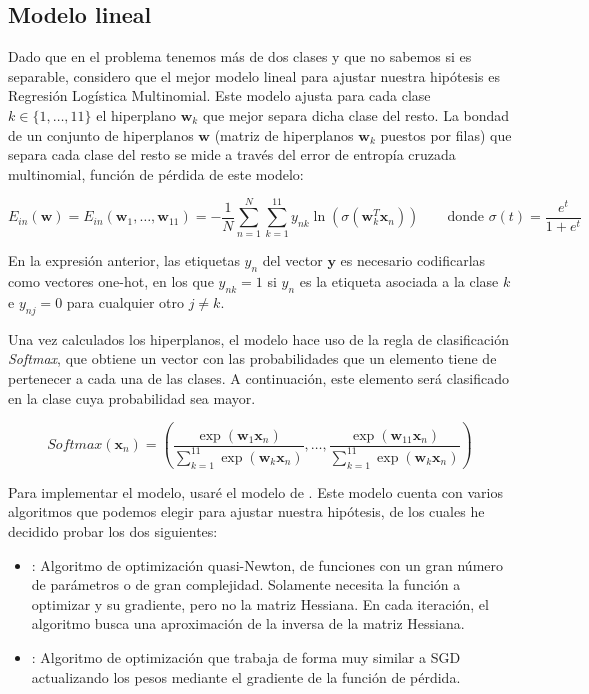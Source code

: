 \documentclass[10pt,a4paper]{article}
\begin{document}
\subsection{Modelo lineal}

Dado que en el problema tenemos más de dos clases y que no sabemos si es separable, considero que el mejor modelo lineal para ajustar nuestra hipótesis es Regresión Logística Multinomial. Este modelo ajusta para cada clase $k \in \{1,\dots,11\}$ el hiperplano $\textbf{w}_k$ que mejor separa dicha clase del resto. La bondad de un conjunto de hiperplanos $\textbf{w}$ (matriz de hiperplanos $\textbf{w}_k$ puestos por filas) que separa cada clase del resto se mide a través del error de entropía cruzada multinomial, función de pérdida de este modelo:

$$E_{in}(\textbf{w}) = E_{in}(\textbf{w}_1,\dots,\textbf{w}_{11}) = - \frac{1}{N} \sum_{n=1}^{N} \sum_{k=1}^{11} y_{nk} \ln(\sigma(\textbf{w}_k^T \textbf{x}_n)) \qquad \text{donde } \sigma(t)=\frac{e^t}{1+e^t}$$

En la expresión anterior, las etiquetas $y_n$ del vector $\textbf{y}$ es necesario codificarlas como vectores one-hot, en los que $y_{nk} = 1$ si $y_n$ es la etiqueta asociada a la clase $k$ e $y_{nj} = 0$ para cualquier otro $j \neq k$.

Una vez calculados los hiperplanos, el modelo hace uso de la regla de clasificación \textit{Softmax}, que obtiene un vector con las probabilidades que un elemento tiene de pertenecer a cada una de las clases. A continuación, este elemento será clasificado en la clase cuya probabilidad sea mayor.

$$Softmax(\textbf{x}_n) = \left(\frac{\exp(\textbf{w}_1 \textbf{x}_n)}{\sum_{k=1}^{11}\exp(\textbf{w}_k \textbf{x}_n)},\dots,\frac{\exp(\textbf{w}_{11} \textbf{x}_n)}{\sum_{k=1}^{11}\exp(\textbf{w}_k \textbf{x}_n)}\right)$$

Para implementar el modelo, usaré el modelo  de . Este modelo cuenta con varios algoritmos que podemos elegir para ajustar nuestra hipótesis, de los cuales he decidido probar los dos siguientes:

\begin{itemize}
	\item {}: Algoritmo de optimización quasi-Newton, de funciones con un gran número de parámetros o de gran complejidad. Solamente necesita la función a optimizar y su gradiente, pero no la matriz Hessiana. En cada iteración, el algoritmo busca una aproximación de la inversa de la matriz Hessiana.
	\item {}: Algoritmo de optimización que trabaja de forma muy similar a SGD actualizando los pesos mediante el gradiente de la función de pérdida.
\end{itemize}
\end{document}
